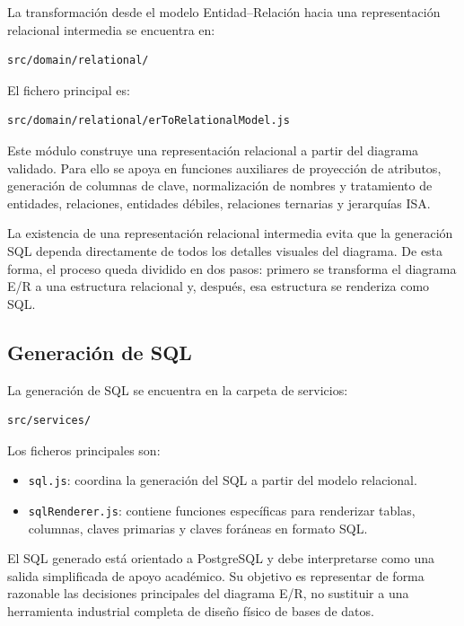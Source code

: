La transformación desde el modelo Entidad--Relación hacia una representación relacional intermedia se encuentra en:

\begin{verbatim}
src/domain/relational/
\end{verbatim}

El fichero principal es:

\begin{verbatim}
src/domain/relational/erToRelationalModel.js
\end{verbatim}

Este módulo construye una representación relacional a partir del diagrama validado. Para ello se apoya en funciones auxiliares de proyección de atributos, generación de columnas de clave, normalización de nombres y tratamiento de entidades, relaciones, entidades débiles, relaciones ternarias y jerarquías ISA.

La existencia de una representación relacional intermedia evita que la generación SQL dependa directamente de todos los detalles visuales del diagrama. De esta forma, el proceso queda dividido en dos pasos: primero se transforma el diagrama E/R a una estructura relacional y, después, esa estructura se renderiza como SQL.

\subsection{Generación de SQL}

La generación de SQL se encuentra en la carpeta de servicios:

\begin{verbatim}
src/services/
\end{verbatim}

Los ficheros principales son:

\begin{itemize}
\item \texttt{sql.js}: coordina la generación del SQL a partir del modelo relacional.

\item \texttt{sqlRenderer.js}: contiene funciones específicas para renderizar tablas, columnas, claves primarias y claves foráneas en formato SQL.

\end{itemize}

El SQL generado está orientado a PostgreSQL y debe interpretarse como una salida simplificada de apoyo académico. Su objetivo es representar de forma razonable las decisiones principales del diagrama E/R, no sustituir a una herramienta industrial completa de diseño físico de bases de datos.


